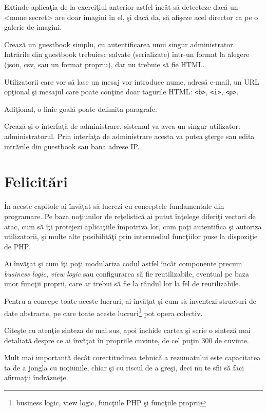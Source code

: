 \begin{Exercise}[title={Remote file storage cu galerie de imagini}]
Extinde aplicaţia de la exerciţiul anterior astfel încât să detecteze
dacă un {\glqq}<nume secret>{\grqq} are doar imagini în el, şi dacă
da, să afişeze acel director ca pe o galerie de imagini.
\end{Exercise}

\begin{Exercise}[title={Guestbook I},difficulty=2]
Crează un guestbook simplu, cu autentificarea unui singur
administrator. Intrările din guestbook trebuiesc salvate (serializate)
într-un format la alegere (json, csv, sau un format propriu), dar
nu trebuie să fie HTML.

Utilizatorii care vor să lase un mesaj vor introduce nume, adresă e-mail, un 
URL opţional şi mesajul care poate conţine doar tagurile HTML:
\texttt{<b>}, \texttt{<i>}, \texttt{<p>}.

Adiţional, o linie goală poate delimita paragrafe.

Crează şi o interfaţă de administrare, sistemul va avea un singur utilizator:
administratorul. Prin interfaţa de administrare acesta va putea şterge sau edita
intrările din guestbook sau bana adrese IP.
\end{Exercise}

\section{Felicitări}
În aceste capitole ai învăţat să lucrezi cu conceptele fundamentale
din programare. Pe baza noţiunilor de reţelistică ai putut înţelege
diferiţi vectori de atac, cum să îţi protejezi aplicaţiile împotriva
lor, cum poţi autentifica şi autoriza utilizatorii, şi multe
alte posibilităţi prin intermediul funcţiilor puse la dispoziţie de
PHP.

Ai învăţat şi cum îţi poţi modulariza codul astfel încât componente
precum \textit{business logic}, \textit{view logic} sau configurarea să fie
reutilizabile, eventual pe baza unor funcţii proprii, care ar
trebui să fie la rândul lor la fel de reutilizabile.

Pentru a concepe toate aceste lucruri, ai învăţat şi cum să inventezi
structuri de date abstracte, pe care toate aceste
lucruri\footnote{business logic, view logic, funcţiile PHP şi
funcţiile proprii} pot opera colectiv.

\begin{Exercise}[title={Recapitulare şi sinteză}]
Citeşte cu atenţie sinteza de mai sus, apoi închide cartea şi scrie o
sinteză mai detaliată despre ce ai învăţat în propriile cuvinte,
de cel puţin 300 de cuvinte.

Mult mai importantă dec\^at corectitudinea tehnică a rezumatului
este capacitatea ta de a jongla cu noţiunile, chiar şi cu
riscul de a greşi, deci nu te sfii să faci afirmaţii \^indrăzneţe.
\end{Exercise}
